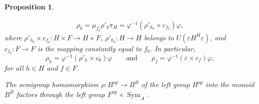 \documentclass[11pt]{amsart}
\DeclareMathOperator{\op}{op}
\newcommand{\Sym}{\operatorname{Sym}}
\newtheorem{proposition}[theorem]{Proposition}
\theoremstyle{definition}
\begin{document}
\begin{proposition}
\begin{itemize}
{  \begin{align*}
  \rho_b
  = \mu_{f_b}\rho'_b\pi_H
  =\varphi^{-1}(\rho'_{h_b}\times c_{f_b})\varphi,
  \end{align*}
  where $\rho'_{h_b}\times c_{f_b}\colon H\times F\to H\times F$, $\rho'_{h_b}\colon H\to H$ belongs to $U(\varepsilon H^H\varepsilon)$, and $c_{f_b}\colon F\to F$ is the mapping constantly equal to $f_b$. In particular, 
  $$
  \rho_h=\varphi^{-1}(\rho'_{h}\times c_0)\varphi
  \qquad\text{and}\qquad
  \rho_f=\varphi^{-1}(\varepsilon\times c_f)\varphi,
  $$
  for all $h\in H$ and $f\in F$.
 \item[\rm (i)] The semigroup homomorphism $\rho\colon B^{\op}\to B^B$ of the  left group $B^{\op}$ into the monoid $B^B$ factors through the left group $F^{\op}\times \Sym_A$.}
\end{itemize}\end{proposition}
\end{document}
